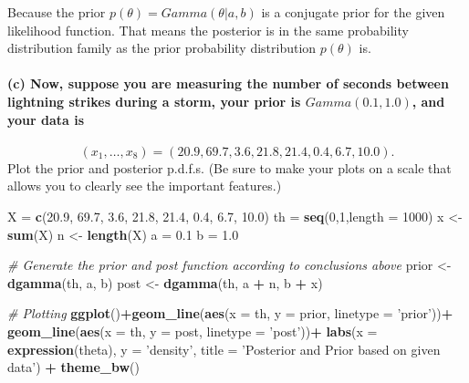 \documentclass[]{article}
\newenvironment{Shaded}{\begin{snugshade}}{\end{snugshade}}
\newcommand{\KeywordTok}[1]{\textcolor[rgb]{0.13,0.29,0.53}{\textbf{#1}}}
\newcommand{\DataTypeTok}[1]{\textcolor[rgb]{0.13,0.29,0.53}{#1}}
\newcommand{\DecValTok}[1]{\textcolor[rgb]{0.00,0.00,0.81}{#1}}
\newcommand{\FloatTok}[1]{\textcolor[rgb]{0.00,0.00,0.81}{#1}}
\newcommand{\StringTok}[1]{\textcolor[rgb]{0.31,0.60,0.02}{#1}}
\newcommand{\CommentTok}[1]{\textcolor[rgb]{0.56,0.35,0.01}{\textit{#1}}}
\newcommand{\OperatorTok}[1]{\textcolor[rgb]{0.81,0.36,0.00}{\textbf{#1}}}
\newcommand{\NormalTok}[1]{#1}
\let\oldparagraph\paragraph
\renewcommand{\paragraph}[1]{\oldparagraph{#1}\mbox{}}
\begin{document}
Because the prior \(p(\theta) = Gamma(\theta|a,b)\) is a conjugate prior
for the given likelihood function. That means the posterior is in the
same probability distribution family as the prior probability
distribution \(p(\theta)\) is.

\paragraph{\texorpdfstring{(c) Now, suppose you are measuring the number
of seconds between lightning strikes during a storm, your prior is
\(Gamma(0.1,1.0)\), and your data
is}{(c) Now, suppose you are measuring the number of seconds between lightning strikes during a storm, your prior is Gamma(0.1,1.0), and your data is}}\label{c-now-suppose-you-are-measuring-the-number-of-seconds-between-lightning-strikes-during-a-storm-your-prior-is-gamma0.11.0-and-your-data-is}

\[(x_1,\dotsc,x_8) = (20.9, 69.7, 3.6, 21.8, 21.4, 0.4, 6.7, 10.0).\]
Plot the prior and posterior p.d.f.s. (Be sure to make your plots on a
scale that allows you to clearly see the important features.)

\begin{Shaded}
\begin{Highlighting}[]
\NormalTok{X =}\StringTok{ }\KeywordTok{c}\NormalTok{(}\FloatTok{20.9}\NormalTok{, }\FloatTok{69.7}\NormalTok{, }\FloatTok{3.6}\NormalTok{, }\FloatTok{21.8}\NormalTok{, }\FloatTok{21.4}\NormalTok{, }\FloatTok{0.4}\NormalTok{, }\FloatTok{6.7}\NormalTok{, }\FloatTok{10.0}\NormalTok{)}
\NormalTok{th =}\StringTok{ }\KeywordTok{seq}\NormalTok{(}\DecValTok{0}\NormalTok{,}\DecValTok{1}\NormalTok{,}\DataTypeTok{length =} \DecValTok{1000}\NormalTok{)}
\NormalTok{x <-}\StringTok{ }\KeywordTok{sum}\NormalTok{(X)}
\NormalTok{n <-}\StringTok{ }\KeywordTok{length}\NormalTok{(X)}
\NormalTok{a =}\StringTok{ }\FloatTok{0.1}
\NormalTok{b =}\StringTok{ }\FloatTok{1.0}

\CommentTok{# Generate the prior and post function according to conclusions above}
\NormalTok{prior <-}\StringTok{ }\KeywordTok{dgamma}\NormalTok{(th, a, b)}
\NormalTok{post <-}\StringTok{ }\KeywordTok{dgamma}\NormalTok{(th, a }\OperatorTok{+}\StringTok{ }\NormalTok{n, b }\OperatorTok{+}\StringTok{ }\NormalTok{x)}

\CommentTok{# Plotting}
\KeywordTok{ggplot}\NormalTok{()}\OperatorTok{+}\KeywordTok{geom_line}\NormalTok{(}\KeywordTok{aes}\NormalTok{(}\DataTypeTok{x =}\NormalTok{ th, }\DataTypeTok{y =}\NormalTok{ prior, }\DataTypeTok{linetype =} \StringTok{'prior'}\NormalTok{))}\OperatorTok{+}
\StringTok{  }\KeywordTok{geom_line}\NormalTok{(}\KeywordTok{aes}\NormalTok{(}\DataTypeTok{x =}\NormalTok{ th, }\DataTypeTok{y =}\NormalTok{ post, }\DataTypeTok{linetype =} \StringTok{'post'}\NormalTok{))}\OperatorTok{+}
\StringTok{  }\KeywordTok{labs}\NormalTok{(}\DataTypeTok{x =} \KeywordTok{expression}\NormalTok{(theta), }\DataTypeTok{y =} \StringTok{'density'}\NormalTok{, }\DataTypeTok{title =} \StringTok{'Posterior and Prior based on given data'}\NormalTok{) }\OperatorTok{+}\StringTok{ }\KeywordTok{theme_bw}\NormalTok{()}
\end{Highlighting}
\end{Shaded}
\end{document}
